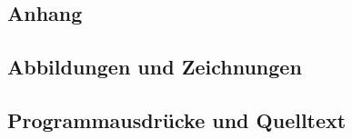 


\listoffigures                   %

\listoftables                    %

\begin{appendix}
\chapter{Anhang}

\section{Abbildungen und Zeichnungen}

\section{Programmausdrücke und Quelltext}

\end{appendix}
